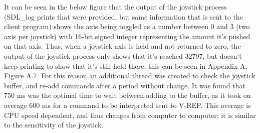 \documentclass[12pt,openany,a4paper]{book}
\begin{document}
%    


It can be seen in the below figure that the output of the joystick process (SDL\_log prints that were provided, but same information that is sent to the client program) shows the axis being toggled as a number between 0 and 3 (two axis per joystick) with 16-bit signed integer representing the amount it's pushed on that axis. Thus, when a joystick axis is held and not returned to zero, the output of the joystick process only shows that it's reached 32797, but doesn't keep printing to show that it's still held there; this can be seen in Appendix A, Figure A.7. For this reason an additional thread was created to check the joystick buffer, and re-add commands after a period without change. It was found that 750 ms was the optimal time to wait between adding to the buffer, as it took on average 600 ms for a command to be interpreted sent to V-REP. This average is CPU speed dependent, and thus changes from computer to computer; it is similar to the sensitivity of the joystick.

\end{document}
